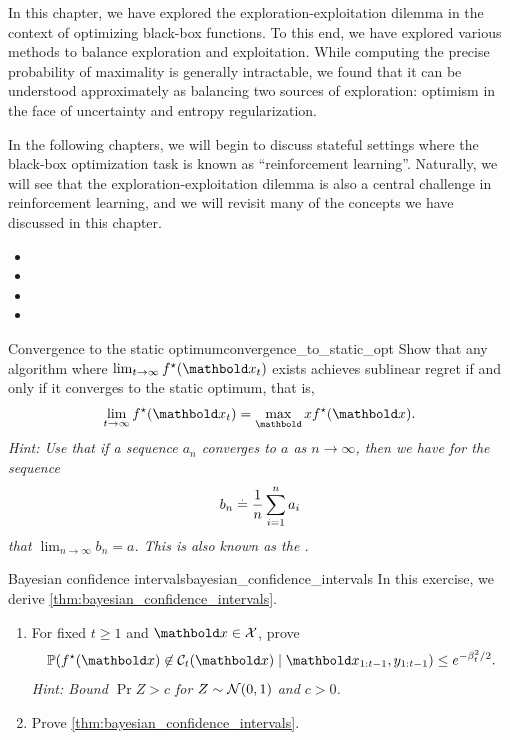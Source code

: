 In this chapter, we have explored the exploration-exploitation dilemma in the context of optimizing black-box functions.
To this end, we have explored various methods to balance exploration and exploitation.
While computing the precise probability of maximality is generally intractable, we found that it can be understood approximately as balancing two sources of exploration: optimism in the face of uncertainty and entropy regularization.

In the following chapters, we will begin to discuss stateful settings where the black-box optimization task is known as ``reinforcement learning''.
Naturally, we will see that the exploration-exploitation dilemma is also a central challenge in reinforcement learning, and we will revisit many of the concepts we have discussed in this chapter.

\begin{oreadings}
  \begin{itemize}
    \item {}
    \item {}
    \item {}
    \item {}
  \end{itemize}
\end{oreadings}

\excheading

\begin{nexercise}{Convergence to the static optimum}{convergence_to_static_opt}
  Show that any algorithm where $\lim_{t\to\infty} \opt{f}(\vx_t)$ exists achieves sublinear regret if and only if it converges to the static optimum, that is, \begin{align}
    \lim_{t\to\infty} \opt{f}(\vx_t) = \max_\vx \opt{f}(\vx).
  \end{align}
  \textit{Hint: Use that if a sequence $a_n$ converges to $a$ as $n \to \infty$, then we have for the sequence \begin{align}
    b_n \overset{.}{=} \frac{1}{n} \sum_{i=1}^n a_i \label{eq:cesaro_mean}
  \end{align} that $\lim_{n\to\infty} b_n = a$. This is also known as the .}
\end{nexercise}

\begin{nexercise}{Bayesian confidence intervals}{bayesian_confidence_intervals}
  In this exercise, we derive \cref{thm:bayesian_confidence_intervals}.
  \begin{enumerate}
    \item For fixed $t \geq 1$ and $\vx \in \spX$, prove \begin{align}
      \Pr{\opt{f}(\vx) \not\in \spC_t(\vx) \mid \vx_{1:t-1}, y_{1:t-1}} \leq e^{- \beta_t^2 / 2}.
    \end{align}
    \textit{Hint: Bound $\Pr{Z > c}$ for $Z \sim \N{0}{1}$ and $c > 0$.}

    \item Prove \cref{thm:bayesian_confidence_intervals}.
  \end{enumerate}
\end{nexercise}

